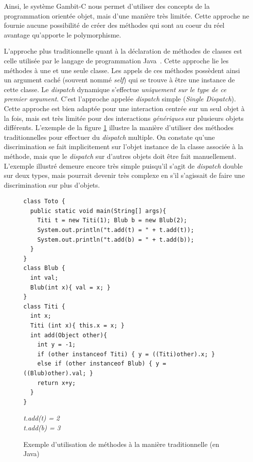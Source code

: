 \documentclass[12pt,oneside,letterpaper,francais]{book}
\begin{document}
Ainsi, le système Gambit-C nous permet d'utiliser des concepts de la
programmation orientée objet, mais d'une manière très limitée. Cette
approche ne fournie aucune possibilité de créer des méthodes qui sont
au coeur du réel avantage qu'apporte le polymorphisme. 

L'approche plus traditionnelle quant à la déclaration de méthodes de
classes est celle utilisée par le langage de programmation
Java~\cite{JavaSpec}. Cette approche lie les méthodes à une et une
seule classe. Les appels de ces méthodes possèdent ainsi un argument
caché (souvent nommé \textit{self}) qui se trouve à être une instance
de cette classe. Le \textit{dispatch} dynamique s'effectue
\emph{uniquement sur le type de ce premier argument}. C'est l'approche
appelée \textit{dispatch} simple (\textit{Single Dispatch}). Cette
approche est bien adaptée pour une interaction centrée sur un seul
objet à la fois, mais est très limitée pour des interactions
\emph{génériques} sur plusieurs objets différents. L'exemple de la
figure \ref{OO:JavaDispatch} illustre la manière d'utiliser des
méthodes traditionnelles pour effectuer du \textit{dispatch}
multiple. On constate qu'une discrimination se fait implicitement sur
l'objet instance de la classe associée à la méthode, mais que le
\textit{dispatch} sur d'autres objets doit être fait
manuellement. L'exemple illustré demeure encore très simple puisqu'il
s'agit de \textit{dispatch} double sur deux types, mais pourrait
devenir très complexe en s'il s'agissait de faire une discrimination
sur plus d'objets.

\begin{figure}[htb!]
  \begin{verbatim}
class Toto {
  public static void main(String[] args){
    Titi t = new Titi(1); Blub b = new Blub(2);
    System.out.println("t.add(t) = " + t.add(t));
    System.out.println("t.add(b) = " + t.add(b));
  }
} 
class Blub {
  int val;
  Blub(int x){ val = x; }
}
class Titi {
  int x;
  Titi (int x){ this.x = x; }
  int add(Object other){
    int y = -1;
    if (other instanceof Titi) { y = ((Titi)other).x; }
    else if (other instanceof Blub) { y = ((Blub)other).val; }
    return x+y;
  }
}
  \end{verbatim}
  {{\it
t.add(t) = 2\\
t.add(b) = 3
  }}
  \caption{Exemple d'utilisation de méthodes à la manière
    traditionnelle (en Java)}
  \label{OO:JavaDispatch}
\end{figure}
\end{document}
